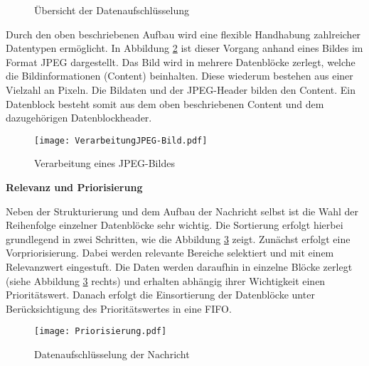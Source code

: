 \begin{figure}[H]
  \centering
  \hfill
  \caption{Übersicht der Datenaufschlüsselung}
  \label{fig:uebersichtdatenaufschluesselung}
\end{figure}

Durch den oben beschriebenen Aufbau wird eine flexible Handhabung
zahlreicher Datentypen ermöglicht. In Abbildung \ref{fig:beispielJPG} ist
dieser Vorgang anhand eines Bildes im Format JPEG dargestellt. Das Bild wird in mehrere
Datenblöcke zerlegt, welche die Bildinformationen (Content) beinhalten.
Diese wiederum bestehen aus einer Vielzahl an Pixeln.
Die Bildaten und der JPEG-Header bilden den Content. Ein Datenblock besteht
somit aus dem oben beschriebenen Content und dem dazugehörigen
Datenblockheader.

\begin{figure}[H]
	\centering
	\texttt{[image: VerarbeitungJPEG-Bild.pdf]}
	\caption{Verarbeitung eines JPEG-Bildes}
	\label{fig:beispielJPG}
\end{figure}

\textbf{Relevanz und Priorisierung}

Neben der Strukturierung und dem Aufbau der Nachricht selbst ist die
Wahl der Reihenfolge einzelner Datenblöcke sehr wichtig. Die Sortierung erfolgt
hierbei grundlegend in zwei Schritten, wie die Abbildung \ref{fig:priorisierungen}
zeigt.
Zunächst erfolgt eine Vorpriorisierung. Dabei werden relevante Bereiche
selektiert und mit einem Relevanzwert eingestuft. Die
Daten werden daraufhin in einzelne Blöcke zerlegt (siehe Abbildung
\ref{fig:priorisierungen} rechts) und erhalten abhängig ihrer Wichtigkeit einen
Prioritätswert. Danach erfolgt die Einsortierung der Datenblöcke unter
Berücksichtigung des Prioritätswertes in eine \gls{FIFO}.

\begin{figure}[H]
	\centering
	\texttt{[image: Priorisierung.pdf]}
	\caption{Datenaufschlüsselung der Nachricht}
	\label{fig:priorisierungen}
\end{figure}
